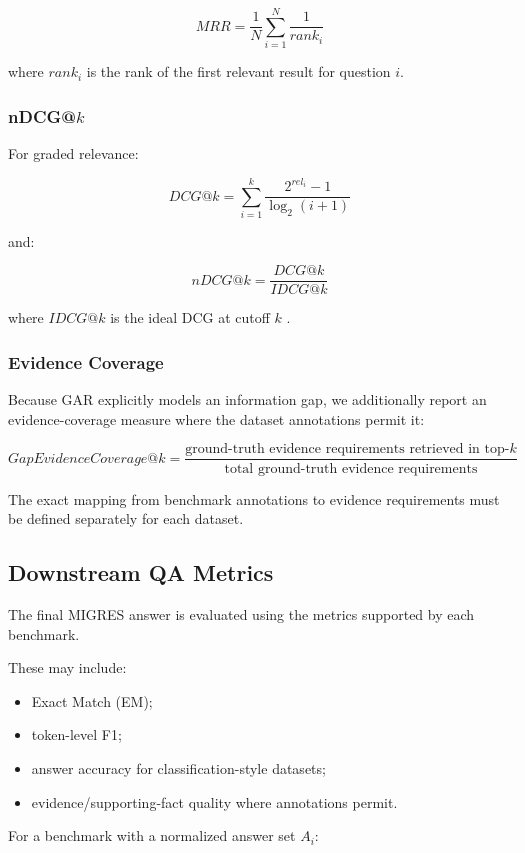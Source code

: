 \documentclass[11pt,a4paper]{article}
\begin{document}
\[
\boxed{
MRR
=
\frac{1}{N}
\sum_{i=1}^{N}
\frac{1}{rank_i}
}
\]

where $rank_i$ is the rank of the first relevant result for question $i$.

\subsubsection{nDCG@$k$}

For graded relevance:

\[
DCG@k
=
\sum_{i=1}^{k}
\frac{2^{rel_i}-1}{\log_2(i+1)}
\]

and:

\[
\boxed{
nDCG@k
=
\frac{DCG@k}{IDCG@k}
}
\]

where $IDCG@k$ is the ideal DCG at cutoff $k$ \citep{jarvelin-kekalainen-2002}.

\subsubsection{Evidence Coverage}

Because GAR explicitly models an information gap, we additionally report an evidence-coverage measure where the dataset annotations permit it:

\[
\boxed{
GapEvidenceCoverage@k
=
\frac{
\text{ground-truth evidence requirements retrieved in top-}k
}{
\text{total ground-truth evidence requirements}
}
}
\]

The exact mapping from benchmark annotations to evidence requirements must be defined separately for each dataset.

\subsection{Downstream QA Metrics}

The final MIGRES answer is evaluated using the metrics supported by each benchmark.

These may include:

\begin{itemize}[leftmargin=1.5em]
\item Exact Match (EM);
\item token-level F1;
\item answer accuracy for classification-style datasets;
\item evidence/supporting-fact quality where annotations permit.
\end{itemize}

For a benchmark with a normalized answer set $A_i$:
\end{document}
